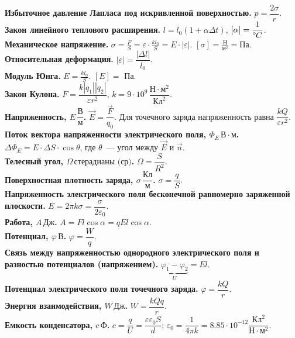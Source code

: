 \documentclass[12pt]{article}
\begin{document}
	\textbf{Избыточное давление Лапласа под искривленной поверхностью.} $p = \dfrac{2 \sigma}{r}$.\\
	\textbf{Закон линейного теплового расширения.} $l = l_0 (1 + \alpha \varDelta t)$, $[\alpha] = \dfrac{1}{\text{\textdegree} C}$.\\
	\textbf{Механическое напряжение.} $\sigma = \frac{F}{S} = \varepsilon \cdot \frac{kl_0}{S} = E \cdot |\varepsilon|$. $[\sigma] = \frac{\text{Н}}{\text{м}^2} = \text{Па}$.\\
	\textbf{Относительная деформация.} $|\varepsilon| = \dfrac{|\varDelta l|}{l_0}$.\\
	\textbf{Модуль Юнга.} $E = \frac{kl_0}{S}$. $[E] =$ Па.\\
	\textbf{Закон Кулона.} $F = \dfrac{k |q_1| |q_2|}{\varepsilon r^2}, \, k = 9 \cdot 10^9 \, \dfrac{\text{Н} \cdot \text{м}^2}{\text{Кл}^2}$.\\
	\textbf{Напряженность, $E \, \dfrac{\text{В}}{\text{м}}$.} $\vec{E} = \dfrac{\vec{F}}{q_0}$. Для точечного заряда напряженность равна $\dfrac{kQ}{\varepsilon r^2}$.\\
	\textbf{Поток вектора напряженности электрического поля, $\Phi_{E} \, \text{В} \cdot \text{м}$.} $\varDelta \Phi_{E} = E \cdot \varDelta S \cdot \cos \theta$, где $\theta$~--- угол между $\vec{E}$ и $\vec{n}$.\\
	\textbf{Телесный угол, $\Omega \, \text{стерадианы (ср)}$.} $\Omega = \dfrac{S}{R^2}$.\\
	\textbf{Поверхностная плотность заряда, $\sigma \, \dfrac{\text{Кл}}{\text{м}}$.} $\sigma = \dfrac{q}{S}$.\\
	\textbf{Напряженность электрического поля бесконечной равномерно заряженной плоскости.} $E = 2 \pi k \sigma = \dfrac{\sigma}{2 \varepsilon_0}$.\\
	\textbf{Работа, $A \, \text{Дж}$.} $A = F l \cos \alpha = q E l \cos \alpha$.\\
	\textbf{Потенциал, $\varphi \, \text{В}$.} $\varphi = \dfrac{W}{q}$.\\
	\textbf{Связь между напряженностью однородного электрического поля и разностью потенциалов (напряжением).} $\underbrace{\varphi_1 - \varphi_2}_U = El$.\\
	\textbf{Потенциал электрического поля точечного заряда.} $\varphi = \dfrac{kQ}{r}$.\\
	\textbf{Энергия взаимодействия, $W \, \text{Дж}$.} $W = \dfrac{kQq}{r}$.\\
	\textbf{Емкость конденсатора, $c \, \text{Ф}$.} $c = \dfrac{q}{U} = \dfrac{\varepsilon \varepsilon_0 S}{d}$; $\varepsilon_0 = \dfrac{1}{4 \pi k} = 8.85 \cdot 10^{-12} \dfrac{\text{Кл}^2}{\text{Н} \cdot \text{м}^2}$.\\
\end{document}
